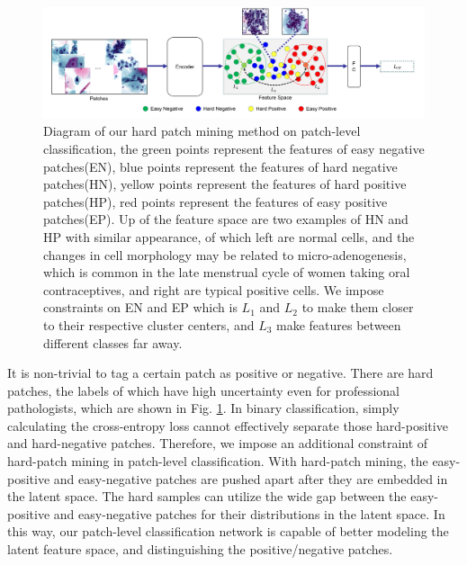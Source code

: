 \begin{figure}[ht]
    \centering
    \includegraphics[width=\textwidth]{figures/patch-level.png}
    \caption{Diagram of our hard patch mining method on patch-level classification, the green points represent the features of easy negative patches(EN), blue points represent the features of hard negative patches(HN), yellow points represent the features of hard positive patches(HP), red points represent the features of easy positive patches(EP). Up of the feature space are two examples of HN and HP with similar appearance, of which left are normal cells, and the changes in cell morphology may be related to micro-adenogenesis, which is common in the late menstrual cycle of women taking oral contraceptives, and right are typical positive cells. We impose constraints on EN and EP which is ${L}_{1}$ and ${L}_{2}$ to make them closer to their respective cluster centers, and ${L}_{3}$ make features between different classes far away.}
    \label{fig:patch}
\end{figure}


It is non-trivial to tag a certain patch as positive or negative. 
There are hard patches, the labels of which have high uncertainty even for professional pathologists, which are shown in Fig. \ref{fig:patch}. 
In binary classification, simply calculating the cross-entropy loss cannot effectively separate those hard-positive and hard-negative patches. 
Therefore, we impose an additional constraint of hard-patch mining in patch-level classification.
With hard-patch mining, the easy-positive and easy-negative patches are pushed apart after they are embedded in the latent space. 
The hard samples can utilize the wide gap between the easy-positive and easy-negative patches for their distributions in the latent space.
In this way, our patch-level classification network is capable of better modeling the latent feature space, and distinguishing the positive/negative patches.

